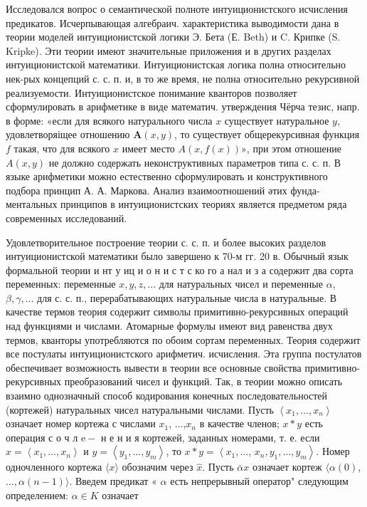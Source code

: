 \documentclass[10pt]{article}
\begin{document}
Исследовался вопрос о семантической полноте интуиционистского исчисления предикатов. Исчерпывающая алгебраич. характеристика выводимости дана в теории моделей интуиционистской логики Э. Бета (Е. Beth) и C. Крипке (S. Kripke). Эти теории имеют значительные приложения и в других разделах интуиционистской математики. Интуиционистская логика полна относительно нек-рых концепций с. с. п. и, в то же время, не полна относительно рекурсивной реализуемости. Интуиционистское понимание кванторов позволяет сформулировать в арифметике в виде математич. утверждения Чёрча тезис, напр. в форме: «если для всякого натурального числа $x$ существует натуральное $y$, удовлетворяіщее отношению $\boldsymbol{A}(x, y)$, то существует общерекурсивная функция $f$ такая, что для всякого $x$ имеет место $A(x, f(x)) »$, при этом отношение $A(x, y)$ не должно содержать неконструктивных параметров типа с. с. п. В языке арифметики можно естественно сформулировать и конструктивного подбора принцип А. А. Маркова. Анализ взаимоотношений әтих фунда- ментальных принципов в интуиционистских теориях является предметом ряда современных исследований.



Удовлетворительное построение теории с. с. п. и более высоких разделов интуиционистской математики было завершено к 70-м гг. 20 в. Обычный язык формальной теории и нт у иц и о н и с т с ко го а нал и з а содержит два сорта переменных: переменные $x, y, z, \ldots$ для натуральных чисел и переменные $\alpha$, $\beta, \gamma, \ldots$ для с. с. п., перерабатывающих натуральные числа в натуральные. В качестве термов теория содержит символы примитивно-рекурсивных операций над функциями и числами. Атомарные формулы имеют вид равенства двух термов, кванторы употребляются по обоим сортам переменных. Теория содержит все постулаты интуиционистского арифметич. исчисления. Эта группа постулатов обеспечивает возможность вывести в теории все основные свойства примитивно-рекурсивных преобразований чисел и функций. Так, в теории можно описать взаимно однозначный способ кодирования конечных последовательностей (кортежей) натуральных чисел натуральными числами. Пусть $\left\langle x_{1}, \ldots, x_{n}\right\rangle$ означает номер кортежа с числами $x_{1}$, ...,$x_{n}$ в качестве членов; $x * y$ есть операция с о ч л $\mathrm{e}-$ н е н и я кортежей, заданных номерами, т. е. если $x=\left\langle x_{1}, \ldots, x_{n}\right\rangle$ и $y=\left\langle y_{1}, \ldots, y_{m}\right\rangle$, то $x * y=\left\langle x_{1}, \ldots\right.$, $\left.x_{n}, y_{1}, \ldots, y_{m}\right\rangle$. Номер одночленного кортежа $\langle x\rangle$ обозначим через $\hat{x}$. Пусть $\bar{\alpha} x$ означает кортеж $\langle\alpha(0)$, $\ldots, \alpha(n-1)\rangle$. Введем предикат « $\alpha$ есть непрерывный оператор" следующим определением: $\alpha \in K$ означает
\end{document}
